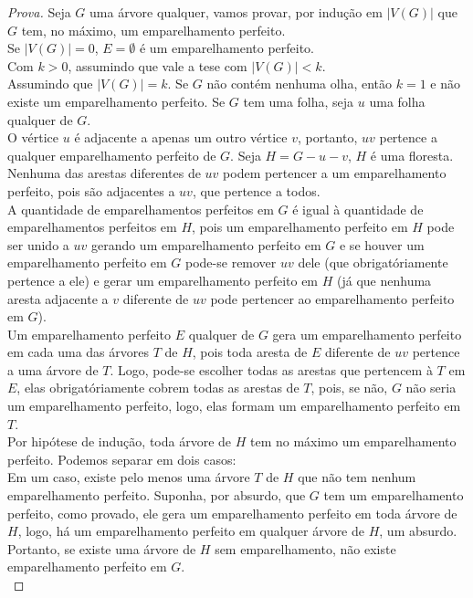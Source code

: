 \documentclass[12pt]{article}
\begin{document}
\begin{proof}[Prova]
Seja $G$ uma árvore qualquer, vamos provar, por indução em $|V(G)|$ que $G$ tem, no máximo, um emparelhamento perfeito. \\
Se $|V(G)| = 0$, $E = \emptyset$ é um emparelhamento perfeito. \\
Com $k > 0$, assumindo que vale a tese com $|V(G)| < k$. \\
Assumindo que $|V(G)| = k$. Se $G$ não contém nenhuma olha, então $k = 1$ e não existe um emparelhamento perfeito. Se $G$ tem uma folha, seja $u$ uma folha qualquer de $G$. \\
O vértice $u$ é adjacente a apenas um outro vértice $v$, portanto, $uv$ pertence a qualquer emparelhamento perfeito de $G$. Seja $H = G - u - v$, $H$ é uma floresta. Nenhuma das arestas diferentes de $uv$ podem pertencer a um emparelhamento perfeito, pois são adjacentes a $uv$, que pertence a todos. \\
A quantidade de emparelhamentos perfeitos em $G$ é igual à quantidade de emparelhamentos perfeitos em $H$, pois um emparelhamento perfeito em $H$ pode ser unido a $uv$ gerando um emparelhamento perfeito em $G$ e se houver um emparelhamento perfeito em $G$ pode-se remover $uv$ dele (que obrigatóriamente pertence a ele) e gerar um emparelhamento perfeito em $H$ (já que nenhuma aresta adjacente a $v$ diferente de $uv$ pode pertencer ao emparelhamento perfeito em $G$). \\
Um emparelhamento perfeito $E$ qualquer de $G$ gera um emparelhamento perfeito em cada uma das árvores $T$ de $H$, pois toda aresta de $E$ diferente de $uv$ pertence a uma árvore de $T$. Logo, pode-se escolher todas as arestas que pertencem à $T$ em $E$, elas obrigatóriamente cobrem todas as arestas de $T$, pois, se não, $G$ não seria um emparelhamento perfeito, logo, elas formam um emparelhamento perfeito em $T$. \\
Por hipótese de indução, toda árvore de $H$ tem no máximo um emparelhamento perfeito. Podemos separar em dois casos: \\
Em um caso, existe pelo menos uma árvore $T$ de $H$ que não tem nenhum emparelhamento perfeito. Suponha, por absurdo, que $G$ tem um emparelhamento perfeito, como provado, ele gera um emparelhamento perfeito em toda árvore de $H$, logo, há um emparelhamento perfeito em qualquer árvore de $H$, um absurdo. Portanto, se existe uma árvore de $H$ sem emparelhamento, não existe emparelhamento perfeito em $G$. \\

\end{proof}
\end{document}
